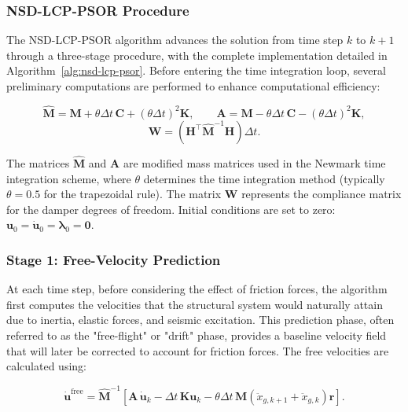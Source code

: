 \documentclass[preprint,12pt,authoryear]{elsarticle}
\begin{document}
\subsubsection{NSD-LCP-PSOR Procedure}
\label{sec:theory:procedure}

The NSD-LCP-PSOR algorithm advances the solution from time step $k$ to $k+1$ through a three-stage procedure, with the complete implementation detailed in Algorithm~\ref{alg:nsd-lcp-psor}. Before entering the time integration loop, several preliminary computations are performed to enhance computational efficiency:

\begin{equation}
	\hat{\bm{M}} = \bm{M} + \theta\Delta t\,\bm{C} + (\theta\Delta t)^{2}\bm{K},
	\qquad
	\bm{A} = \bm{M} - \theta\Delta t\,\bm{C} - (\theta\Delta t)^{2}\bm{K},
	\label{eq:Mhat}
\end{equation}
\begin{equation}
	\bm{W} = \left(\bm{H}^{\top}\hat{\bm{M}}^{-1}\bm{H}\right)\Delta t.
	\label{eq:W}
\end{equation}

The matrices $\hat{\bm{M}}$ and $\bm{A}$ are modified mass matrices used in the Newmark time integration scheme, where $\theta$ determines the time integration method (typically $\theta=0.5$ for the trapezoidal rule). The matrix $\bm{W}$ represents the compliance matrix for the damper degrees of freedom. Initial conditions are set to zero: $\bm{u}_0 = \dot{\bm{u}}_0 = \bm{\lambda}_0 = \bm{0}$.

\subsubsection*{Stage 1: Free-Velocity Prediction}
\label{sec:theory:free_velocity}

At each time step, before considering the effect of friction forces, the algorithm first computes the velocities that the structural system would naturally attain due to inertia, elastic forces, and seismic excitation. This prediction phase, often referred to as the "free-flight" or "drift" phase, provides a baseline velocity field that will later be corrected to account for friction forces. The free velocities are calculated using:

\begin{equation}
	\dot{\bm{u}}^{\mathrm{free}} = \hat{\bm{M}}^{-1}
	\!\left[
	\bm{A}\,\dot{\bm{u}}_k
	- \Delta t\,\bm{K}\bm{u}_k
	- \theta\Delta t\,\bm{M}\!\left(\ddot{x}_{g,k+1}+\ddot{x}_{g,k}\right)\bm{r}
	\right].
	\label{eq:vfree}
\end{equation}
\end{document}
